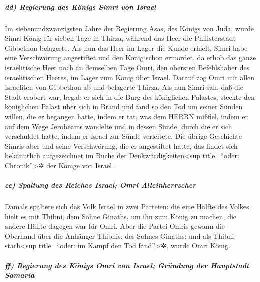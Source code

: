\hypertarget{dd-regierung-des-kuxf6nigs-simri-von-israel}{%
\subparagraph{dd) Regierung des Königs Simri von
Israel}\label{dd-regierung-des-kuxf6nigs-simri-von-israel}}

Im siebenundzwanzigsten Jahre der Regierung Asas, des
Königs von Juda, wurde Simri König für sieben Tage in Thirza, während
das Heer die Philisterstadt Gibbethon belagerte. Als nun
das Heer im Lager die Kunde erhielt, Simri habe eine Verschwörung
angestiftet und den König schon ermordet, da erhob das ganze
israelitische Heer noch an demselben Tage Omri, den obersten
Befehlshaber des israelitischen Heeres, im Lager zum König über Israel.
Darauf zog Omri mit allen Israeliten von Gibbethon ab und
belagerte Thirza. Als nun Simri sah, daß die Stadt
erobert war, begab er sich in die Burg des königlichen Palastes, steckte
den königlichen Palast über sich in Brand und fand so den Tod
um seiner Sünden willen, die er begangen hatte, indem er
tat, was dem HERRN mißfiel, indem er auf dem Wege Jerobeams wandelte und
in dessen Sünde, durch die er sich verschuldet hatte, indem er Israel
zur Sünde verleitete. Die übrige Geschichte Simris aber
und seine Verschwörung, die er angestiftet hatte, das findet sich
bekanntlich aufgezeichnet im Buche der Denkwürdigkeiten\textless sup
title=``oder: Chronik''\textgreater✲ der Könige von Israel.

\hypertarget{ee-spaltung-des-reiches-israel-omri-alleinherrscher}{%
\subparagraph{ee) Spaltung des Reiches Israel; Omri
Alleinherrscher}\label{ee-spaltung-des-reiches-israel-omri-alleinherrscher}}

Damals spaltete sich das Volk Israel in zwei Parteien:
die eine Hälfte des Volkes hielt es mit Thibni, dem Sohne Ginaths, um
ihn zum König zu machen, die andere Hälfte dagegen war für Omri.
Aber die Partei Omris gewann die Oberhand über die
Anhänger Thibnis, des Sohnes Ginaths; und als Thibni starb\textless sup
title=``oder: im Kampf den Tod fand''\textgreater✲, wurde Omri König.

\hypertarget{ff-regierung-des-kuxf6nigs-omri-von-israel-gruxfcndung-der-hauptstadt-samaria}{%
\subparagraph{ff) Regierung des Königs Omri von Israel; Gründung der
Hauptstadt
Samaria}\label{ff-regierung-des-kuxf6nigs-omri-von-israel-gruxfcndung-der-hauptstadt-samaria}}

